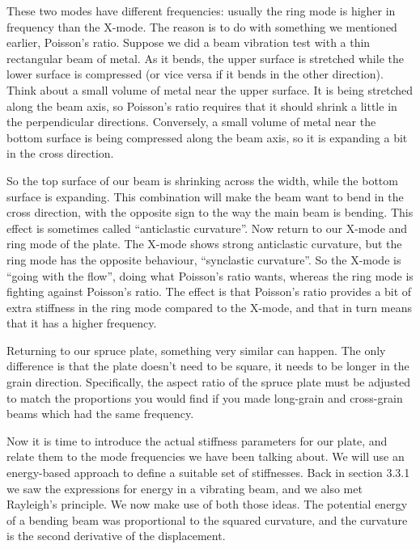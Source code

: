   These two modes have different frequencies: usually the ring mode is higher 
  in frequency than the X-mode. The reason is to do with something we mentioned 
  earlier, Poisson’s ratio. Suppose we did a beam vibration test with a thin 
  rectangular beam of metal. As it bends, the upper surface is stretched while 
  the lower surface is compressed (or vice versa if it bends in the other 
  direction). Think about a small volume of metal near the upper surface. It is 
  being stretched along the beam axis, so Poisson’s ratio requires that it 
  should shrink a little in the perpendicular directions. Conversely, a small 
  volume of metal near the bottom surface is being compressed along the beam 
  axis, so it is expanding a bit in the cross direction. 

  So the top surface of our beam is shrinking across the width, while the 
  bottom surface is expanding. This combination will make the beam want to bend 
  in the cross direction, with the opposite sign to the way the main beam is 
  bending. This effect is sometimes called “anticlastic curvature”. Now return 
  to our X-mode and ring mode of the plate. The X-mode shows strong anticlastic 
  curvature, but the ring mode has the opposite behaviour, “synclastic 
  curvature”. So the X-mode is “going with the flow”, doing what Poisson’s 
  ratio wants, whereas the ring mode is fighting against Poisson’s ratio. The 
  effect is that Poisson’s ratio provides a bit of extra stiffness in the ring 
  mode compared to the X-mode, and that in turn means that it has a higher 
  frequency. 

  Returning to our spruce plate, something very similar can happen. The only 
  difference is that the plate doesn’t need to be square, it needs to be longer 
  in the grain direction. Specifically, the aspect ratio of the spruce plate 
  must be adjusted to match the proportions you would find if you made 
  long-grain and cross-grain beams which had the same frequency. 

  Now it is time to introduce the actual stiffness parameters for our plate, 
  and relate them to the mode frequencies we have been talking about. We will 
  use an energy-based approach to define a suitable set of stiffnesses. Back in 
  section 3.3.1 we saw the expressions for energy in a vibrating beam, and we 
  also met Rayleigh's principle. We now make use of both those ideas. The 
  potential energy of a bending beam was proportional to the squared curvature, 
  and the curvature is the second derivative of the displacement. 

